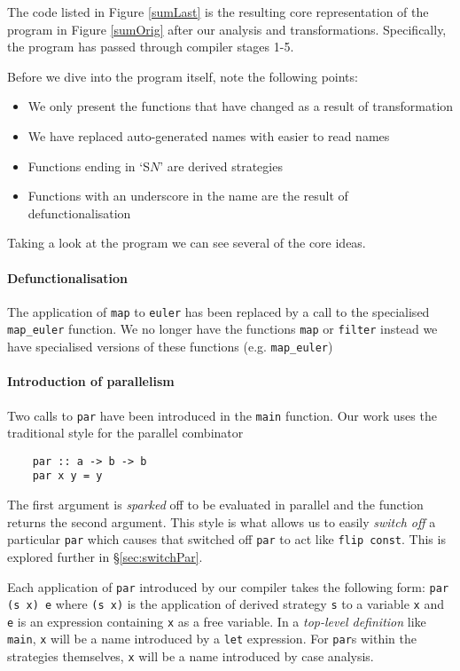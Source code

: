 The code listed in Figure \ref{sumLast} is the resulting core representation
of the program in Figure \ref{sumOrig} after our analysis and transformations.
Specifically, the program has passed through compiler stages 1-5.

Before we dive into the program itself, note the following points:

\begin{itemize}
    \item We only present the functions that have changed as a result of transformation
    \item We have replaced auto-generated names with easier to read names
    \item Functions ending in `S$N$' are derived strategies
    \item Functions with an underscore in the name are the result of defunctionalisation
\end{itemize}

Taking a look at the program we can see several of the core ideas.

\paragraph{Defunctionalisation}
The application of \verb-map- to \verb-euler- has been replaced by a call to
the specialised \verb-map_euler- function.  We no longer have the functions
\verb-map- or \verb-filter- instead we have specialised versions of these
functions (e.g. \verb-map_euler-)

\paragraph{Introduction of parallelism}
Two calls to \verb-par- have been introduced in the \texttt{main} function. Our
work uses the traditional style for the parallel combinator \citep{strategies}

\begin{verbatim}
    par :: a -> b -> b
    par x y = y
\end{verbatim}

The first argument is \emph{sparked} off to be evaluated in parallel and the
function returns the second argument. This style is what allows us to easily
\emph{switch off} a particular \verb-par- which causes that switched off
\verb-par- to act like \verb-flip const-. This is explored further in
\S\ref{sec:switchPar}.

Each application of \verb-par- introduced by our compiler takes the following
form: \verb-par (s x) e- where \verb-(s x)- is the application of derived
strategy \verb-s- to a variable \verb$x$ and \verb$e$ is an expression containing \verb$x$ as a
free variable.  In a \emph{top-level definition} like \verb-main-, \verb$x$ will be a
name introduced by a \verb-let- expression. For \verb-par-s within the
strategies themselves, \verb$x$ will be a name introduced by case analysis.

